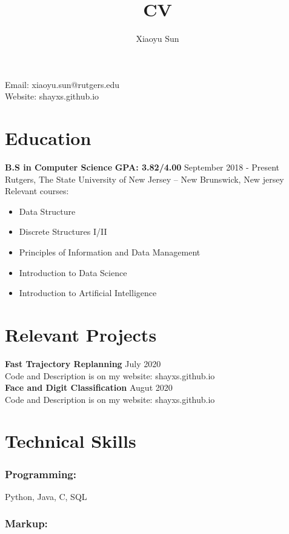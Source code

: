 \documentclass{article}
\makeatletter
\renewcommand{\maketitle}{
\begin{center}
{\huge\bfseries
\theauthor}

\vspace{.25em}

Email: xiaoyu.sun@rutgers.edu\\
Website: shayxs.github.io
\end{center}
}
\makeatother
\begin{document}
\title{CV}
\author{Xiaoyu Sun}
\maketitle

\section{Education}
\textbf{B.S in Computer Science} \space \textbf{GPA: 3.82/4.00}
\hfill{September 2018 - Present}\\
Rutgers, The State University of New Jersey – New Brunswick, New jersey\\
Relevant courses:
\begin{itemize}
  \itemsep0em
  \item Data Structure
  \item Discrete Structures I/II
  \item Principles of Information and Data Management
  \item Introduction to Data Science
  \item Introduction to Artificial Intelligence
\end{itemize}


\section{Relevant Projects}
\textbf{Fast Trajectory Replanning}
\hfill{July 2020}\\
Code and Description is on my website: shayxs.github.io\\

\noindent \textbf{Face and Digit Classification}
\hfill{Augut 2020}\\
Code and Description is on my website: shayxs.github.io\\
\section{Technical Skills}

\subsubsection{Programming:}

Python, Java, C, SQL

\subsubsection{Markup:}
\end{document}
